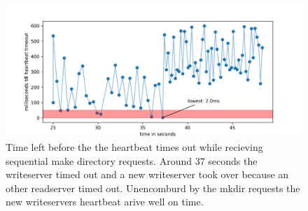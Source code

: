 \begin{figure}[htbp]
	\centering
	\includegraphics{../data/hb_timeout.png}
	\caption{Time left before the the heartbeat times out while recieving sequential make directory requests. Around 37 seconds the writeserver timed out and a new writeserver took over because an other readserver timed out. Unencomburd by the mkdir requests the new writeservers heartbeat arive well on time.}
	\label{fig:hbt}
\end{figure}
